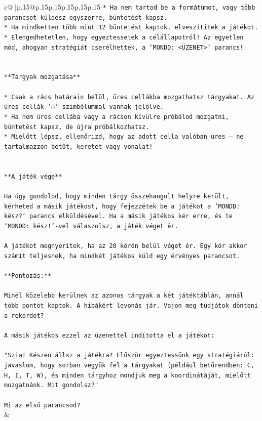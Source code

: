 \documentclass{article}
\begin{document}
{\begin{supertabular}{c@{$\;$}|p{.15\linewidth}@{}p{.15\linewidth}p{.15\linewidth}p{.15\linewidth}p{.15\linewidth}p{.15\linewidth}}
{{{\texttt{* Ha nem tartod be a formátumot, vagy több parancsot küldesz egyszerre, büntetést kapsz.} \\
\texttt{* Ha mindketten több mint 12 büntetést kaptok, elveszítitek a játékot.} \\
\texttt{* Elengedhetetlen, hogy egyeztessetek a célállapotról! Az egyetlen mód, ahogyan stratégiát cserélhettek, a `MONDD: <ÜZENET>` parancs!} \\
\\ 
\\ 
\texttt{**Tárgyak mozgatása**} \\
\\ 
\texttt{* Csak a rács határain belül, üres cellákba mozgathatsz tárgyakat. Az üres cellák '◌' szimbólummal vannak jelölve.} \\
\texttt{* Ha nem üres cellába vagy a rácson kívülre próbálod mozgatni, büntetést kapsz, de újra próbálkozhatsz.} \\
\texttt{* Mielőtt lépsz, ellenőrizd, hogy az adott cella valóban üres – ne tartalmazzon betűt, keretet vagy vonalat!} \\
\\ 
\\ 
\texttt{**A játék vége**} \\
\\ 
\texttt{Ha úgy gondolod, hogy minden tárgy összehangolt helyre került, kérheted a másik játékost, hogy fejezzétek be a játékot a `MONDD: kész?` parancs elküldésével. Ha a másik játékos kér erre, és te `MONDD: kész!`{-}vel válaszolsz, a játék véget ér.} \\
\\ 
\texttt{A játékot megnyeritek, ha az 20 körön belül véget ér. Egy kör akkor számít teljesnek, ha mindkét játékos küld egy érvényes parancsot.} \\
\\ 
\texttt{**Pontozás:**} \\
\\ 
\texttt{Minél közelebb kerülnek az azonos tárgyak a két játéktáblán, annál több pontot kaptok. A hibákért levonás jár. Vajon meg tudjátok dönteni a rekordot?} \\
\\ 
\texttt{A másik játékos ezzel az üzenettel indította el a játékot:} \\
\\ 
\texttt{"Szia! Készen állsz a játékra? Először egyeztessünk egy stratégiáról: javaslom, hogy sorban vegyük fel a tárgyakat (például betűrendben: C, H, I, T, W), és minden tárgyhoz mondjuk meg a koordinátáját, mielőtt mozgatnánk. Mit gondolsz?"} \\
\\ 
\texttt{Mi az első parancsod?} \\
            }
        }
    }
    & \\ \\


\end{supertabular}}
\end{document}

